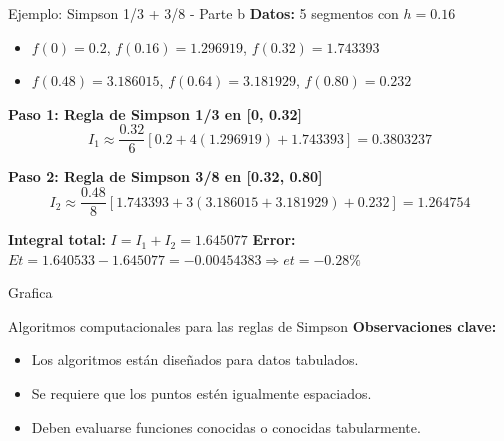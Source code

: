\documentclass[main.tex]{subfiles}
\begin{document}
\begin{frame}{Ejemplo: Simpson 1/3 + 3/8 - Parte b}
\textbf{Datos:} 5 segmentos con \( h = 0.16 \)
\begin{itemize}
  \item \( f(0) = 0.2 \), \( f(0.16) = 1.296919 \), \( f(0.32) = 1.743393 \)
  \item \( f(0.48) = 3.186015 \), \( f(0.64) = 3.181929 \), \( f(0.80) = 0.232 \)
\end{itemize}

\textbf{Paso 1: Regla de Simpson 1/3 en [0, 0.32]}
\[
I_1 \approx \frac{0.32}{6}[0.2 + 4(1.296919) + 1.743393] = 0.3803237
\]

\textbf{Paso 2: Regla de Simpson 3/8 en [0.32, 0.80]}
\[
I_2 \approx \frac{0.48}{8}[1.743393 + 3(3.186015 + 3.181929) + 0.232] = 1.264754
\]

\textbf{Integral total:} \( I = I_1 + I_2 = 1.645077 \)
\textbf{Error:} \( Et = 1.640533 - 1.645077 = -0.00454383 \Rightarrow et = -0.28\% \)
\end{frame}
\begin{frame}{Grafica}
\begin{center}
\end{center}
\end{frame}


\begin{frame}{Algoritmos computacionales para las reglas de Simpson}
\textbf{Observaciones clave:}
\begin{itemize}
  \item Los algoritmos están diseñados para datos tabulados.
  \item Se requiere que los puntos estén igualmente espaciados.
  \item Deben evaluarse funciones conocidas o conocidas tabularmente.
\end{itemize}
\end{frame}
\end{document}
